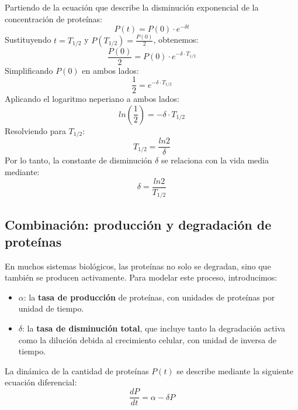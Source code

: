 Partiendo de la ecuación que describe la disminución exponencial de la concentración de proteínas:
$$P(t) = P(0) \cdot e^{-\delta t}$$
Sustituyendo $t = T_{1/2}$ y $P(T_{1/2}) = \frac{P(0)}{2}$, obtenemos:
$$\frac{P(0)}{2} = P(0) \cdot e^{-\delta \cdot T_{1/2}}$$
Simplificando $P(0)$ en ambos lados:
$$\frac{1}{2} = e^{-\delta \cdot T_{1/2}}$$
Aplicando el logaritmo neperiano a ambos lados:
$$ln(\frac{1}{2}) = - \delta \cdot T_{1/2}$$
Resolviendo para $T_{1/2}$:
$$T_{1/2} = \frac{ln 2}{\delta}$$
Por lo tanto, la constante de disminución $\delta$ se relaciona con la vida media mediante:
$$\delta = \frac{ln 2}{T_{1/2}}$$

\subsection{Combinación: producción y degradación de proteínas}
En muchos sistemas biológicos, las proteínas no solo se degradan, sino que también se producen activamente. Para modelar este proceso, introducimos:
\begin{itemize}
\item $\alpha$: la \textbf{tasa de producción} de proteínas, con unidades de proteínas por unidad de tiempo.
\item $\delta$: la \textbf{tasa de disminución total}, que incluye tanto la degradación activa como la dilución debida al crecimiento celular, con unidad de inversa de tiempo.
\end{itemize}
La dinámica de la cantidad de proteínas $P(t)$ se describe mediante la siguiente ecuación diferencial:
$$\frac{dP}{dt} = \alpha - \delta P$$

